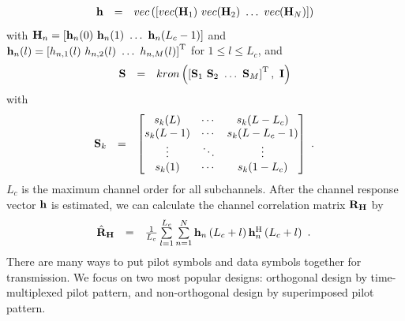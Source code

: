 \documentclass[10pt,fleqn, twocolumn]{IEEEtran}
\newcommand{\bh}{{\bf h}}
\newcommand{\bH}{{\bf H}}
\newcommand{\bS}{{\bf S}}
\newcommand{\bI}{{\bf I}}
\newcommand{\bR}{{\bf R}}
\begin{document}
\begin{equation}\hspace{-0.00in}
\begin{array}{rcl}
\bh&=&\mbox{vec}\left(\left[\mbox{vec}(\bH_{1})\
\mbox{vec}(\bH_{2})\ \ldots\ \mbox{vec}(\bH_{N})\right]\right)
\end{array}
\end{equation}
\noindent with $\bH_{n}=\left[\bh_{n}(0)\ \bh_{n}(1)\ \ldots\
\bh_{n}(L_{c}-1)\right]$ and $\bh_{n}(l)=\left[h_{n,1}(l)\
h_{n,2}(l)\ \ldots\ h_{n,M}(l)\right]^{\rm T}$ for $1\leq l \leq
L_{c}$, and
\begin{equation}\hspace{-0.00in}
\begin{array}{rcl}
\bS&=&\mbox{kron}\left(\left[\bS_{1}\ \bS_{2}\ \ldots\
\bS_{M}\right]^{\rm T},\ \bI\right)
\end{array}
\end{equation}
\noindent with
\begin{equation}\hspace{-0.10in}
\begin{array}{rcl}
\bS_{k}&=&\left[\begin{matrix}
s_{k}(L)&\cdots&s_{k}(L-L_{c})\\
s_{k}(L-1)&\cdots&s_{k}(L-L_{c}-1)\\
\vdots&\ddots&\vdots\\
s_{k}(1)&\cdots&s_{k}(1-L_{c})
\end{matrix}\right]
\end{array}.\label{S_k}
\end{equation}
\noindent $L_{c}$ is the maximum channel order for all
subchannels. After the channel response vector $\bh$ is estimated,
we can calculate the channel correlation matrix $\bR_{\bH}$ by
\begin{equation}\hspace{-0.1in}
\begin{array}{rcl}
\hat{\bR}_{\bH}&=&\frac{1}{L_{c}}\sum\limits_{l=1}^{L_{c}}\sum\limits_{n=1}^{N}\bh_{n}\left(L_{c}+l\right)\bh_{n}^{\rm
H}\left(L_{c}+l\right)
\end{array}.\label{R_h_actual}
\end{equation}
\noindent There are many ways to put pilot symbols and data
symbols together for transmission. We focus on two most popular
designs: {orthogonal design} by {time-multiplexed pilot pattern},
and {non-orthogonal design} by {superimposed pilot pattern}.
\end{document}
